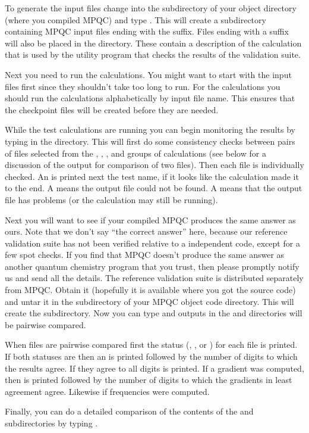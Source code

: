  To generate the input files change into the 
subdirectory of your object directory (where you compiled MPQC) and type
.  This will create a  subdirectory containing
MPQC input files ending with the  suffix.  Files ending with a
 suffix will also be placed in the  directory.
These contain a description of the calculation that is used by the utility
program that checks the results of the validation suite.

  Next you need to run the calculations.  You might want to start with the
 input files first since they shouldn't take too long to run.
For the  calculations you should run the calculations
alphabetically by input file name.  This ensures that the checkpoint files
will be created before they are needed.

  While the test calculations are running you can begin monitoring the
results by typing  in the 
directory.  This will first do some consistency checks between pairs of
files selected from the , , , and
 groups of calculations (see below for a discussion of the
output for comparison of two files).  Then each file is individually
checked.  An  is printed next the test name, if it looks like the
calculation made it to the end.  A  means the output file
could not be found.  A  means that the output file has
problems (or the calculation may still be running).

  Next you will want to see if your compiled MPQC produces the same answer
as ours.  Note that we don't say ``the correct answer'' here, because our
reference validation suite has not been verified relative to a independent
code, except for a few spot checks.  If you find that MPQC doesn't produce
the same answer as another quantum chemistry program that you trust, then
please promptly notify us and send all the details.  The reference
validation suite is distributed separately from MPQC.  Obtain it (hopefully
it is available where you got the source code) and untar it in the
 subdirectory of your MPQC object code
directory.  This will create the  subdirectory.  Now you can
type  and outputs in the  and 
directories will be pairwise compared.

  When files are pairwise compared first the status (,
, or ) for each file is printed.  If both
statuses are  then an  is printed followed by the number
of digits to which the results agree.  If they agree to all digits
 is printed.  If a gradient was computed, then  is
printed followed by the number of digits to which the gradients in least
agreement agree.  Likewise if frequencies were computed.

  Finally, you can do a detailed comparison of the contents of the
 and  subdirectories by typing .


